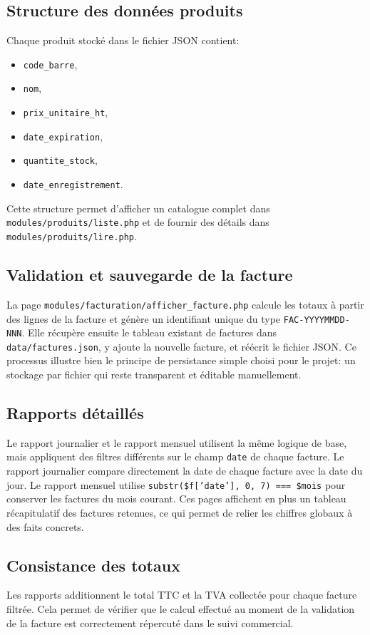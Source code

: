 \documentclass[12pt,a4paper]{article}
\begin{document}
\subsection{Structure des données produits}
Chaque produit stocké dans le fichier JSON contient:
\begin{itemize}
  \item \texttt{code\_barre},
  \item \texttt{nom},
  \item \texttt{prix\_unitaire\_ht},
  \item \texttt{date\_expiration},
  \item \texttt{quantite\_stock},
  \item \texttt{date\_enregistrement}.
\end{itemize}
Cette structure permet d'afficher un catalogue complet dans \texttt{modules/produits/liste.php} et de fournir des détails dans \texttt{modules/produits/lire.php}.

\subsection{Validation et sauvegarde de la facture}
La page \texttt{modules/facturation/afficher\_facture.php} calcule les totaux à partir des lignes de la facture et génère un identifiant unique du type \texttt{FAC-YYYYMMDD-NNN}. Elle récupère ensuite le tableau existant de factures dans \texttt{data/factures.json}, y ajoute la nouvelle facture, et réécrit le fichier JSON.
Ce processus illustre bien le principe de persistance simple choisi pour le projet: un stockage par fichier qui reste transparent et éditable manuellement.

\newpage

\subsection{Rapports détaillés}
Le rapport journalier et le rapport mensuel utilisent la même logique de base, mais appliquent des filtres différents sur le champ \texttt{date} de chaque facture. Le rapport journalier compare directement la date de chaque facture avec la date du jour. Le rapport mensuel utilise \texttt{substr(\$f['date'], 0, 7) === \$mois} pour conserver les factures du mois courant.
Ces pages affichent en plus un tableau récapitulatif des factures retenues, ce qui permet de relier les chiffres globaux à des faits concrets.

\subsection{Consistance des totaux}
Les rapports additionnent le total TTC et la TVA collectée pour chaque facture filtrée. Cela permet de vérifier que le calcul effectué au moment de la validation de la facture est correctement répercuté dans le suivi commercial.
\end{document}

